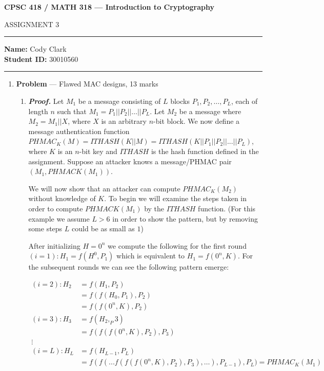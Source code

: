 \documentclass[11pt]{article}
\theoremstyle{definition}
\newcounter{problem}
\begin{document}
\begin{center}
{\bf \Large CPSC 418 / MATH 318 --- Introduction to Cryptography

ASSIGNMENT 3 }
\end{center}

\hrule 	

\textbf{Name:} Cody Clark \\
\textbf{Student ID:} 30010560

\medskip \hrule

\begin{enumerate} \itemsep 20pt

\item[] \textbf{Problem \theproblem} --- Flawed MAC designs, 13 marks

\begin{enumerate}

\item %
\textbf{\emph{Proof.}} Let $M_1$ be a message consisting of $L$ blocks $P_1, P_2, …, P_L$, each of length $n$ such that $M_1 = P_1 || P_2 || … || P_L$. Let $M_2$ be a message where $M_2 = M_1 || X$, where $X$ is an arbitrary $n$-bit block. We now define a message authentication function $PHMAC_K(M) = ITHASH(K||M) = ITHASH(K||P_1||P_2||...||P_L)$, where $K$ is an $n$-bit key and $ITHASH$ is the hash function defined in the assignment. Suppose an attacker knows a message/PHMAC pair $(M_1, PHMACK(M_1))$.

We will now show that an attacker can compute $PHMAC_K(M_2)$ without knowledge of $K$. To begin we will examine the steps taken in order to compute $PHMACK(M_1)$ by the $ITHASH$ function. (For this example we assume $L > 6$ in order to show the pattern, but by removing some steps $L$ could be as small as $1$)

After initializing $H = 0^n$ we compute the following for the first round $(i = 1): H_1 = f(H^0, P_1)$ which is equivalent to $H_1 = f(0^n, K)$. For the subsequent rounds we can see the following pattern emerge:

\begin{align*}
(i = 2): H_2 &= f(H_1, P_2) \\
&= f(f(H_0, P_1), P_2) \\
&= f(f(0^n, K), P_2)\\
(i = 3): H_3 &= f(H_2, _P3)\\
&= f(f(f(0^n, K), P_2), P_3)\\
\vdots\\
(i = L): H_L &= f(H_{L-1}, P_L)\\
&= f(f(...f(f(f(0^n, K), P_2), P_3), …), P_{L-1}), P_L) = PHMAC_K(M_1)\\
\end{align*}


\end{enumerate}
\end{enumerate}
\end{document}
